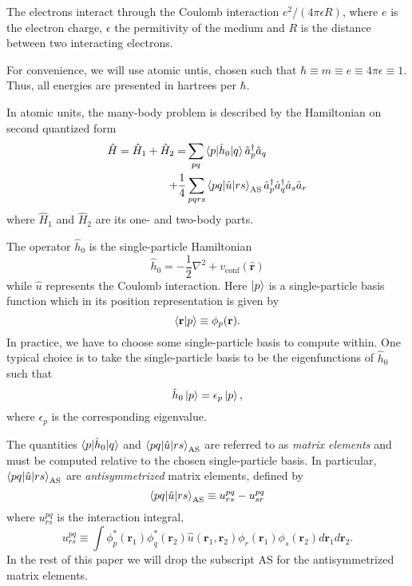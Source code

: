 \documentclass[aip,jcp,reprint,floatfix]{revtex4-1}
\begin{document}
The electrons interact through the Coulomb interaction $e^2/(4\pi
\epsilon R)$, where $e$ is the electron charge, $\epsilon$ the
permitivity of the medium and $R$ is the distance between two
interacting electrons.

For convenience, we will use atomic untis, chosen such that $\hbar
\equiv m \equiv e \equiv 4\pi \epsilon \equiv 1$. Thus, all energies
are presented in hartrees per $\hbar$.

In atomic units, the many-body problem is described by the Hamiltonian
on second quantized form
\begin{align}
 \hat{H} = \hat{H}_1 + \hat{H}_2 = &\sum_{pq} \braket{p|\hat{h}_0|q}\hat{a}_p^\dagger\hat{a}_q \nonumber \\
 + \frac{1}{4}&\sum_{pqrs}\braket{pq|\hat{u}|rs}_{\text{AS}}\hat{a}_p^\dagger\hat{a}_q^\dagger\hat{a}_s\hat{a}_r \label{FieldFreeHamiltonian}
\end{align}
where $\hat{H}_1$ and $\hat{H}_2$ are its one- and two-body parts. 

The operator $\hat{h}_0$ is the single-particle Hamiltonian
\begin{equation}
 \hat{h}_0 = -\frac{1}{2}\nabla^2 + v_{\text{conf}}(\mathbf{\hat{r}})
\end{equation}
while $\hat{u}$ represents the Coulomb interaction. Here $\ket{p}$ is
a single-particle basis function which in its position representation
is given by
\begin{equation}
 \braket{\mathbf{r}|p} \equiv \phi_p(\mathbf{r}).
\end{equation}
In practice, we have to choose some single-particle basis to compute
within. One typical choice is to take the single-particle basis to be
the eigenfunctions of $\hat{h}_0$ such that
\begin{equation}
 \hat{h}_0 \ket{p} = \epsilon_p \ket{p},
\end{equation}
where $\epsilon_p$ is the corresponding eigenvalue.

The quantities $\braket{p|\hat{h}_0|q}$ and
$\braket{pq|\hat{u}|rs}_{\text{AS}}$ are referred to as \textit{matrix
  elements} and must be computed relative to the chosen
single-particle basis. In particular,
$\braket{pq|\hat{u}|rs}_{\text{AS}}$ are \textit{antisymmetrized}
matrix elements, defined by
\begin{equation}
 \braket{pq|\hat{u}|rs}_{\text{AS}} \equiv u^{pq}_{rs} - u^{pq}_{sr}
\end{equation}
where $u^{pq}_{rs}$ is the interaction integral, 
\begin{equation}
 u^{pq}_{rs} \equiv \int \phi^*_p(\mathbf{r}_1) \phi^*_q(\mathbf{r}_2) \hat{u}(\mathbf{r}_1,\mathbf{r}_2) \phi_r(\mathbf{r}_1)\phi_s(\mathbf{r}_2) d\mathbf{r}_1 d\mathbf{r}_2.
\end{equation}
In the rest of this paper we will drop the subscript AS for the
antisymmetrized matrix elements.
\end{document}
